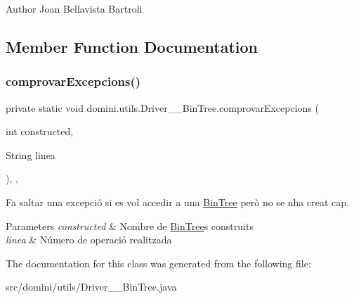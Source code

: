 \begin{DoxyAuthor}{Author}
Joan Bellavista Bartroli 
\end{DoxyAuthor}


\subsection{Member Function Documentation}
\mbox{\label{classdomini_1_1utils_1_1Driver____BinTree_a06b6edeb965f3677c7ebb085d512f568}} 
\subsubsection{\texorpdfstring{comprovar\+Excepcions()}{comprovarExcepcions()}}
{\footnotesize\ttfamily private static void domini.\+utils.\+Driver\+\_\+\+\_\+\+Bin\+Tree.\+comprovar\+Excepcions (\begin{DoxyParamCaption}\item[{int}]{constructed,  }\item[{String}]{linea }\end{DoxyParamCaption})\hspace{0.3cm}{\ttfamily [inline]}, {\ttfamily [static]}, {\ttfamily [private]}}



Fa saltar una excepció si es vol accedir a una \hyperlink{classdomini_1_1utils_1_1BinTree}{Bin\+Tree} però no se n\textquotesingle{}ha creat cap. 


\begin{DoxyParams}{Parameters}
{\em constructed} & Nombre de \hyperlink{classdomini_1_1utils_1_1BinTree}{Bin\+Tree}\textquotesingle{}s construits \\
\hline
{\em linea} & Número de operació realitzada \\
\hline
\end{DoxyParams}


The documentation for this class was generated from the following file\+:\begin{DoxyCompactItemize}
\item 
src/domini/utils/Driver\+\_\+\+\_\+\+Bin\+Tree.\+java\end{DoxyCompactItemize}
